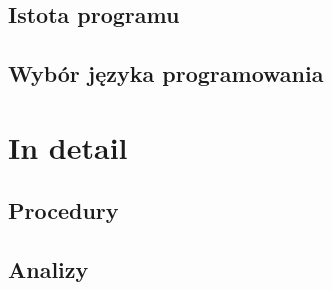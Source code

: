 \documentclass[a4paper, justified, nobib]{tufte-book}
\begin{document}
\section{Istota programu}
\section{Wybór języka programowania}

\chapter{In detail}
\section{Procedury}
\section{Analizy}

\backmatter

\end{document}
